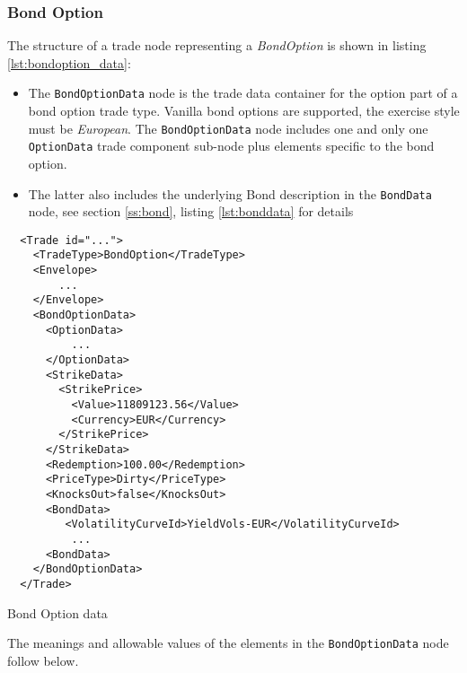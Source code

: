 \subsubsection{Bond Option}
\label{ss:bondoption}

The structure of a trade node representing a \emph{BondOption}  is shown in
listing \ref{lst:bondoption_data}: 
\begin{itemize}
\item The \lstinline!BondOptionData!  node is the trade data container for
the option part of a bond option trade type. Vanilla bond 
options are supported, the exercise style must be \emph{European}. 
The \lstinline!BondOptionData!  node includes one and 
only one \lstinline!OptionData! trade component sub-node plus elements
specific to the bond option. 
\item The latter also includes the underlying Bond description in the \lstinline!BondData!
  node, see section \ref{ss:bond}, listing \ref{lst:bonddata} for details
\end{itemize}

\begin{listing}[H]
\begin{verbatim}
  <Trade id="...">
    <TradeType>BondOption</TradeType>
    <Envelope>
        ...
    </Envelope>
    <BondOptionData>
      <OptionData>
          ...
      </OptionData>
      <StrikeData>
        <StrikePrice>
          <Value>11809123.56</Value>
          <Currency>EUR</Currency>
        </StrikePrice>
      </StrikeData>
      <Redemption>100.00</Redemption>
      <PriceType>Dirty</PriceType>
      <KnocksOut>false</KnocksOut>
      <BondData>
         <VolatilityCurveId>YieldVols-EUR</VolatilityCurveId>
          ...
      <BondData>
    </BondOptionData>
  </Trade>
\end{verbatim}
\caption{Bond Option data}
\label{lst:bondoption_data}
\end{listing}

The meanings and allowable values of the elements in the \lstinline!BondOptionData!  node follow below.

